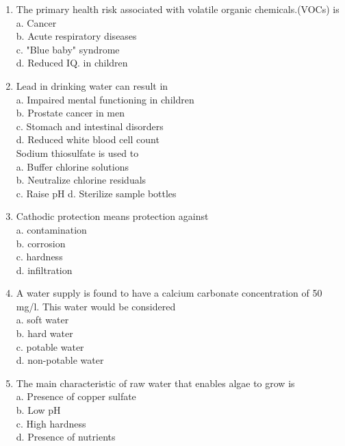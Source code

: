 \begin{enumerate}[1.]
\item The primary health risk associated with volatile organic chemicals.(VOCs) is\\
a. Cancer\\
b. Acute respiratory diseases\\
c. "Blue baby" syndrome\\
d. Reduced IQ. in children 

\item Lead in drinking water can result in\\
a. Impaired mental functioning in children\\
b. Prostate cancer in men\\
c. Stomach and intestinal disorders\\
d. Reduced white blood cell count\\

Sodium thiosulfate is used to\\
a. Buffer chlorine solutions\\
b. Neutralize chlorine residuals\\
c. Raise pH
d. Sterilize sample bottles\\

\item Cathodic protection means protection against\\
a. contamination\\
b. corrosion\\
c. hardness\\
d. infiltration\\

\item A water supply is found to have a calcium carbonate concentration of 50 mg/l. This water would be considered\\
a. soft water\\
b. hard water\\
c. potable water\\
d. non-potable water\\


\item The main characteristic of raw water that enables algae to grow is\\
a. Presence of copper sulfate\\
b. Low pH\\
c. High hardness\\
d. Presence of nutrients\\







\end{enumerate}


